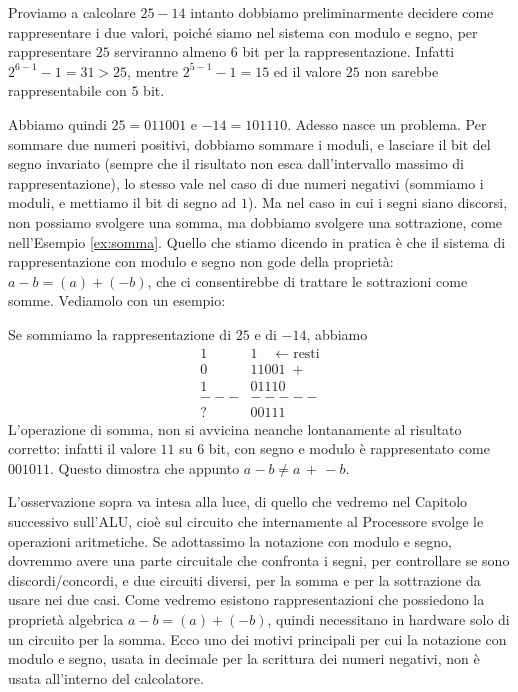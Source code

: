 \begin{ex} Proviamo a calcolare $25 - 14$ intanto dobbiamo preliminarmente decidere come rappresentare i due valori, poiché siamo nel sistema con modulo e segno, per rappresentare $25$ serviranno almeno $6$ bit per la rappresentazione. Infatti $2^{6-1}-1 = 31 > 25$, mentre $2^{5-1}-1 = 15$ ed il valore $25$ non sarebbe rappresentabile con $5$ bit. 

Abbiamo quindi $25 = 011001$ e  $-14 = 101110$. Adesso nasce un problema. 
Per sommare due numeri positivi, dobbiamo sommare i moduli, e lasciare il bit
del segno invariato (sempre che il risultato non esca dall'intervallo massimo
di rappresentazione), lo stesso vale nel caso di due numeri negativi (sommiamo
i moduli, e mettiamo il bit di segno ad $1$). Ma nel caso in cui i segni siano
discorsi, non possiamo svolgere una somma, ma dobbiamo svolgere una sottrazione,
come nell'Esempio \ref{ex:somma}. Quello che stiamo dicendo in pratica è che
il sistema di rappresentazione con modulo e segno non gode della proprietà: $a-b = (a)+(-b)$, che ci consentirebbe di trattare le sottrazioni come somme. Vediamolo con un esempio:

Se sommiamo la rappresentazione di $25$ e di $-14$, abbiamo
\begin{align*}
	    1&1 \quad \leftarrow\text{resti}\\ 
	    0&11001 \;+\\
	    1&01110\\
      ---&-----\\
	    ?&00111
\end{align*} L'operazione di somma, non si avvicina neanche lontanamente
al risultato corretto: infatti il valore $11$ su $6$ bit, con segno e modulo è rappresentato come $001011$. Questo dimostra che appunto $a-b \neq a \,+\, -b$.
\end{ex}

L'osservazione sopra va intesa alla luce, di quello che vedremo nel Capitolo successivo sull'ALU, cioè sul circuito che internamente al Processore svolge le
operazioni aritmetiche. Se adottassimo la notazione con modulo e segno, dovremmo avere una parte circuitale che confronta i segni, per controllare se
sono discordi/concordi, e due circuiti diversi, per la somma e per la sottrazione da usare nei due casi. Come vedremo esistono
rappresentazioni che possiedono la proprietà algebrica $a-b = (a)+(-b)$,
quindi necessitano in hardware solo di un circuito per la somma. Ecco
uno dei motivi principali per cui la notazione con modulo e segno, usata
in decimale per la scrittura dei numeri negativi, non è usata all'interno del calcolatore.

